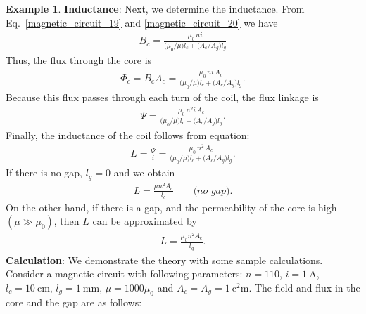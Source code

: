 \documentclass[11pt,a4paper,oneside]{book}
\numberwithin{equation}{section}
\theoremstyle{it}
\theoremstyle{definition}
\newtheorem{example}{Example}[section]
\begin{document}
\begin{example}
\textbf{Inductance}: Next, we determine the inductance. From Eq.~\eqref{magnetic_circuit_19} and \ref{magnetic_circuit_20} we have
	\begin{equation}\label{magnetic_circuit_23}
	{\begin{aligned}
			B_c=\frac{\mu_0\,ni}{\Big(\mu_0/\mu\Big)l_c+\Big(A_c/A_g\Big)l_g}
	\end{aligned}}
	\end{equation}
Thus, the flux through the core is 
	\begin{equation}\label{magnetic_circuit_24}
	{\begin{aligned}
			\Phi_c=B_cA_c=\frac{\mu_0\,ni\,A_c}{\Big(\mu_0/\mu\Big)l_c+\Big(A_c/A_g\Big)l_g}.
	\end{aligned}}
\end{equation}
Because this flux passes through each turn of the coil, the flux linkage is
	\begin{equation}\label{magnetic_circuit_25}
	{\begin{aligned}
			\Psi=\frac{\mu_0\,n^2i\,A_c}{\Big(\mu_0/\mu\Big)l_c+\Big(A_c/A_g\Big)l_g}.
	\end{aligned}}
	\end{equation}
Finally, the inductance of the coil follows from equation:
	\begin{equation}\label{magnetic_circuit_26}
	{\begin{aligned}
			L=\frac{\Psi}{i}=\frac{\mu_0\,n^2\,A_c}{\Big(\mu_0/\mu\Big)l_c+\Big(A_c/A_g\Big)l_g}.
	\end{aligned}}
	\end{equation}
If there is no gap, $l_g=0$ and we obtain
	\begin{equation}\label{magnetic_circuit_27}
	{\begin{aligned}
			L=\frac{\mu n^2 A_c}{l_c}\qquad\textit{(no gap).}
	\end{aligned}}
	\end{equation}
On the other hand, if there is a gap, and the permeability of the core is high $(\mu\gg\mu_0)$, then $L$ can be approximated by
	\begin{equation}\label{magnetic_circuit_28}
	{\begin{aligned}
			L=\frac{\mu_0 n^2 A_c}{l_g}.
	\end{aligned}}
	\end{equation}
\textbf{Calculation}: We demonstrate the theory with some sample calculations. Consider a magnetic circuit with following parameters: $n=110$, $i=\SI{1}{\ampere}$, $l_c=\SI{10}{\centi\meter}$, $l_g=\SI{1}{\milli\meter}$, $\mu=1000\mu_0$ and $A_c=A_g=\SI{1}{\square\centi\meter}$. The field and flux in the core and the gap are as follows:

\end{example}
\end{document}
